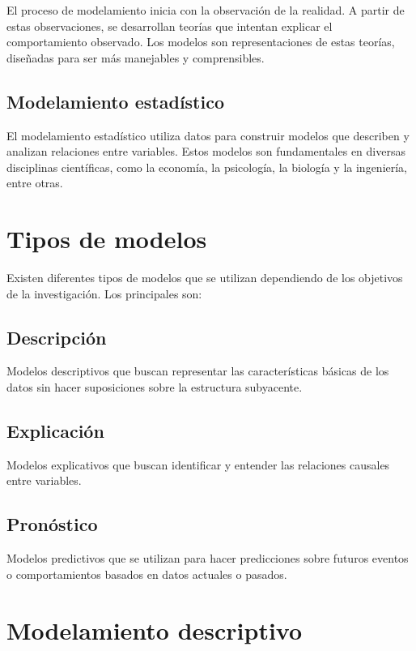 \documentclass[
  letterpaper,
  DIV=11,
  numbers=noendperiod]{scrreprt}
\begin{document}
El proceso de modelamiento inicia con la observación de la realidad. A
partir de estas observaciones, se desarrollan teorías que intentan
explicar el comportamiento observado. Los modelos son representaciones
de estas teorías, diseñadas para ser más manejables y comprensibles.

\subsection{Modelamiento estadístico}\label{modelamiento-estaduxedstico}

El modelamiento estadístico utiliza datos para construir modelos que
describen y analizan relaciones entre variables. Estos modelos son
fundamentales en diversas disciplinas científicas, como la economía, la
psicología, la biología y la ingeniería, entre otras.

\section{Tipos de modelos}\label{tipos-de-modelos}

Existen diferentes tipos de modelos que se utilizan dependiendo de los
objetivos de la investigación. Los principales son:

\subsection{Descripción}\label{descripciuxf3n}

Modelos descriptivos que buscan representar las características básicas
de los datos sin hacer suposiciones sobre la estructura subyacente.

\subsection{Explicación}\label{explicaciuxf3n}

Modelos explicativos que buscan identificar y entender las relaciones
causales entre variables.

\subsection{Pronóstico}\label{pronuxf3stico}

Modelos predictivos que se utilizan para hacer predicciones sobre
futuros eventos o comportamientos basados en datos actuales o pasados.

\section{Modelamiento descriptivo}\label{modelamiento-descriptivo}
\end{document}
